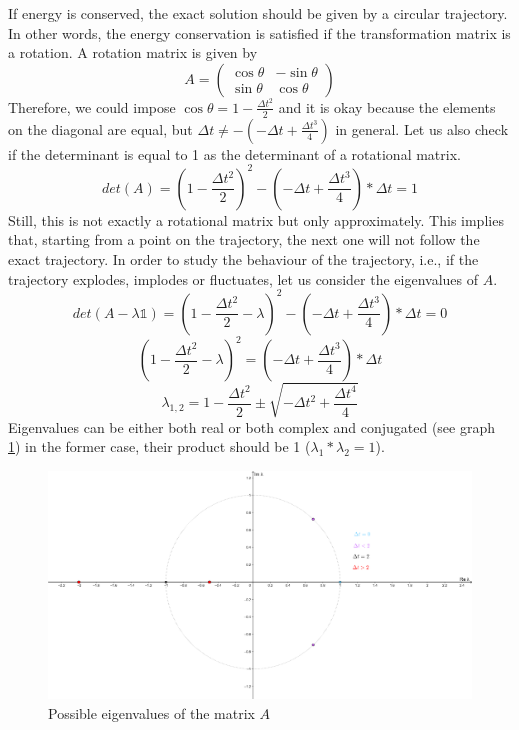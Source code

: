 If energy is conserved, the exact solution should be given by a circular trajectory. In other words, the energy conservation is satisfied if the transformation matrix is a rotation.
A rotation matrix is given by
\begin{equation}
A=
    \begin{pmatrix}
      \cos{\theta} & -\sin{\theta} \\
      \sin{\theta} & \cos{\theta}
    \end{pmatrix}
\end{equation}
Therefore, we could impose $\cos{\theta}=1-\frac{\Delta t^2}{2}$ and it is okay because the elements on the diagonal are equal, but $ \Delta t\neq -(-\Delta t+\frac{\Delta t^3}{4})$ in general. Let us also check if the determinant is equal to 1 as the determinant of a rotational matrix.
\begin{equation}
    det(A)= \left(1-\frac{\Delta t^2}{2}\right)^2-\left(-\Delta t+\frac{\Delta t^3}{4}\right)*\Delta t =1
\end{equation}
Still, this is not exactly a rotational matrix but only approximately. This implies that, starting from a point on the trajectory, the next one will not follow the exact trajectory. In order to study the behaviour of the trajectory, i.e., if the trajectory explodes, implodes or fluctuates, let us consider the eigenvalues of $A$.
\begin{equation}
det(A-\lambda \mathbb{1})=(1-\frac{\Delta t^2}{2}-\lambda)^2-(-\Delta t+\frac{\Delta t^3}{4})*\Delta t=0
\end{equation}
\begin{equation*}
(1-\frac{\Delta t^2}{2}-\lambda)^2=(-\Delta t+\frac{\Delta t^3}{4})*\Delta t
\end{equation*}
\begin{equation*}
    \lambda_{1,2}=1-\frac{\Delta t^2}{2}\pm \sqrt{-\Delta t^2 + \frac{\Delta t^4}{4}} 
\end{equation*}
Eigenvalues can be either both real or both complex and conjugated (see graph \ref{fig:complexplane}) in the former case, their product should be 1 ($\lambda_1*\lambda_2=1$). 
\begin{figure}[H]
    \centering
    \includegraphics[scale=3.0]{Integrators/images/complexplane.png}
    \caption{Possible eigenvalues of the matrix $A$}
    \label{fig:complexplane}
\end{figure}
